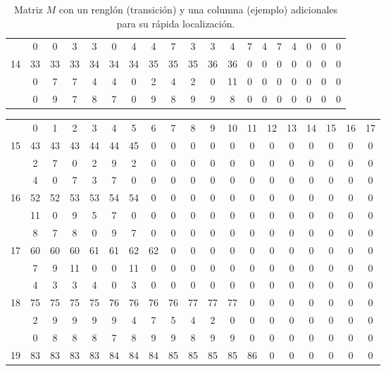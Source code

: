 \documentclass[letterpaper,12pt]{book}
\theoremstyle{definition} \newtheorem{Def}{Definición}[chapter]
\theoremstyle{definition} \newtheorem{Teo}{Teorema}[chapter]
\theoremstyle{definition} \newtheorem{Pro}{Proposición}[chapter]
\theoremstyle{definition} \newtheorem{Lema}{Lema}[chapter]
\begin{document}
\begin{table}[h]
{\begin{tabular}{ c c c c c c c c c c c c c c c c c c c}
 & 0 & 0 & 3 & 3 & 0 & 4 & 4 & 7 & 3 & 3 & 4 & 7 & 4 & 7 & 4 & 0 & 0 & 0 \\ %
14 & 33 & 33 & 33 & 34 & 34 & 34 & 35 & 35 & 35 & 36 & 36 & 0 & 0 & 0 & 0 & 0 & 0 & 0 \\ %
 & 0 & 7 & 7 & 4 & 4 & 0 & 2 & 4 & 2 & 0 & 11 & 0 & 0 & 0 & 0 & 0 & 0 & 0 \\ %
 & 0 & 9 & 7 & 8 & 7 & 0 & 9 & 8 & 9 & 9 & 8 & 0 & 0 & 0 & 0 & 0 & 0 & 0 \\ %
\end{tabular}
}
\caption{Matriz $M$ con un renglón (transición) y una columna (ejemplo) adicionales para su rápida localización.}
\end{table}


\begin{table}
{\tiny
\centering
\begin{tabular}{c c c c c c c c c c c c c c c c c c c}
& 0 & 1 & 2 & 3 & 4 & 5 & 6 & 7 & 8 & 9 & 10 & 11 & 12 & 13 & 14 & 15 & 16 & 17 \\ 
15 & 43 & 43 & 43 & 44 & 44 & 45 & 0 & 0 & 0 & 0 & 0 & 0 & 0 & 0 & 0 & 0 & 0 & 0 \\ %
 & 2 & 7 & 0 & 2 & 9 & 2 & 0 & 0 & 0 & 0 & 0 & 0 & 0 & 0 & 0 & 0 & 0 & 0 \\ %
 & 4 & 0 & 7 & 3 & 7 & 0 & 0 & 0 & 0 & 0 & 0 & 0 & 0 & 0 & 0 & 0 & 0 & 0 \\ %
16 & 52 & 52 & 53 & 53 & 54 & 54 & 0 & 0 & 0 & 0 & 0 & 0 & 0 & 0 & 0 & 0 & 0 & 0 \\ %
 & 11 & 0 & 9 & 5 & 7 & 0 & 0 & 0 & 0 & 0 & 0 & 0 & 0 & 0 & 0 & 0 & 0 & 0 \\ %
 & 8 & 7 & 8 & 0 & 9 & 7 & 0 & 0 & 0 & 0 & 0 & 0 & 0 & 0 & 0 & 0 & 0 & 0 \\ %
17 & 60 & 60 & 60 & 61 & 61 & 62 & 62 & 0 & 0 & 0 & 0 & 0 & 0 & 0 & 0 & 0 & 0 & 0  \\%
 & 7 & 9 & 11 & 0 & 0 & 11 & 0 & 0 & 0 & 0 & 0 & 0 & 0 & 0 & 0 & 0 & 0 & 0 \\ %
 & 4 & 3 & 3 & 4 & 0 & 3 & 0 & 0 & 0 & 0 & 0 & 0 & 0 & 0 & 0 & 0 & 0 & 0 \\ %
18 & 75 & 75 & 75 & 75 & 76 & 76 & 76 & 76 & 77 & 77 & 77 & 0 & 0 & 0 & 0 & 0 & 0 & 0 \\ %
 & 2 & 9 & 9 & 9 & 9 & 4 & 7 & 5 & 4 & 2 & 0 & 0 & 0 & 0 & 0 & 0 & 0 & 0 \\ %
 & 0 & 8 & 8 & 8 & 7 & 8 & 9 & 9 & 8 & 9 & 9 & 0 & 0 & 0 & 0 & 0 & 0 & 0 \\ %
19 & 83 & 83 & 83 & 83 & 84 & 84 & 84 & 85 & 85 & 85 & 85 & 86 & 0 & 0 & 0 & 0 & 0 & 0 \\ %

\end{tabular}}
\end{table}
\end{document}
